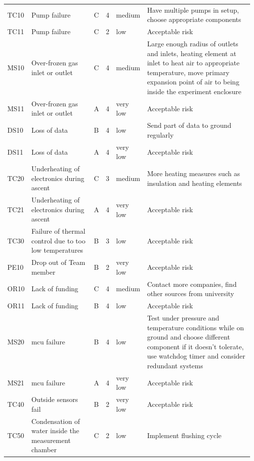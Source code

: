 \documentclass[
  a4paper,
  11pt,
  openany,
  parskip,
  toc=totoc,
  listof=totoc,
  bibliography=totoc
]{scrreprt}
\begin{document}
\begin{longtable}{L{1.5cm}L{3cm}L{1cm}L{1cm}L{2cm}L{6cm}}
 TC10 & Pump failure & C & 4 & medium & Have multiple pumps in setup, choose appropriate components \\
 TC11 & Pump failure & C & 2 & low &  Acceptable risk \\
 MS10 & Over-frozen gas inlet or outlet & C & 4 & medium & Large enough radius of outlets and inlets, heating element at inlet to heat air to appropriate temperature, move primary expansion point of air to being inside the experiment enclosure \\
 MS11 & Over-frozen gas inlet or outlet & A & 4 & very low & Acceptable risk \\
 DS10 & Loss of data & B & 4 & low & Send part of data to ground regularly \\
 DS11 & Loss of data & A & 4 & very low & Acceptable risk \\
 TC20 & Underheating of electronics during ascent & C & 3 & medium & More heating measures such as insulation and heating elements \\
 TC21 & Underheating of electronics during ascent & A & 4 & very low & Acceptable risk \\
 TC30 & Failure of thermal control due to too low temperatures & B & 3 & low & Acceptable risk\\
 PE10 & Drop out of Team member & B & 2 & very low & Acceptable risk \\
 OR10 & Lack of funding & C & 4 & medium & Contact more companies, find other sources from university \\
 OR11 & Lack of funding & B & 4 & low & Acceptable risk  \\
 MS20 & \gls{mcu} failure & B & 4 & low & Test under pressure and temperature conditions while on ground and choose different component if it doesn't tolerate, use watchdog timer and consider redundant systems\\
 MS21 & \gls{mcu} failure & A & 4 & very low & Acceptable risk\\
 TC40 & Outside sensors fail & B & 2 & very low & Acceptable risk \\
 TC50 & Condensation of water inside the measurement chamber & C & 2 & low & Implement flushing cycle \\

\end{longtable}
\end{document}
